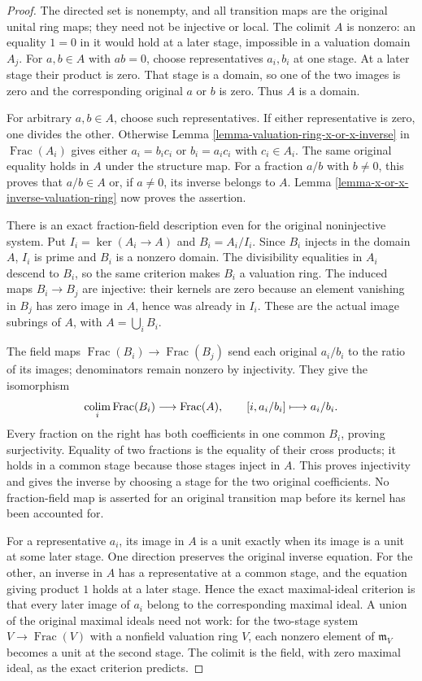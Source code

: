 \begin{proof}
The directed set is nonempty,
and all transition maps are
the original unital ring maps;
they need not be injective
or local. The colimit $A$
is nonzero: an equality
$1=0$ in it would hold
at a later stage, impossible
in a valuation domain $A_j$.
For $a,b\in A$ with $ab=0$,
choose representatives $a_i,b_i$
at one stage. At a later
stage their product is zero.
That stage is a domain,
so one of the two images
is zero and the corresponding
original $a$ or $b$ is zero.
Thus $A$ is a domain.

For arbitrary $a,b\in A$,
choose such representatives.
If either representative is
zero, one divides the other.
Otherwise Lemma
\ref{lemma-valuation-ring-x-or-x-inverse}
in $\operatorname{Frac}(A_i)$
gives either $a_i=b_i c_i$
or $b_i=a_i c_i$ with
$c_i\in A_i$. The same
original equality holds in
$A$ under the structure map.
For a fraction $a/b$ with
$b\neq0$, this proves that
$a/b\in A$ or, if $a\neq0$,
its inverse belongs to $A$.
Lemma
\ref{lemma-x-or-x-inverse-valuation-ring}
now proves the assertion.

There is an exact fraction-field
description even for the original
noninjective system. Put
$I_i=\ker(A_i\to A)$ and
$B_i=A_i/I_i$. Since $B_i$
injects in the domain $A$,
$I_i$ is prime and $B_i$
is a nonzero domain. The
divisibility equalities in
$A_i$ descend to $B_i$,
so the same criterion makes
$B_i$ a valuation ring.
The induced maps $B_i\to B_j$
are injective: their kernels
are zero because an element
vanishing in $B_j$ has zero
image in $A$, hence was
already in $I_i$.
These are the actual image
subrings of $A$, with
$A=\bigcup_i B_i$.

The field maps
$\operatorname{Frac}(B_i)\to\operatorname{Frac}(B_j)$
send each original $a_i/b_i$
to the ratio of its images;
denominators remain nonzero
by injectivity. They give
the isomorphism
$$
\mathop{\rm colim}_i\operatorname{Frac}(B_i)
\longrightarrow\operatorname{Frac}(A),
\qquad[i,a_i/b_i]\longmapsto a_i/b_i.
$$
Every fraction on the right
has both coefficients in
one common $B_i$, proving
surjectivity. Equality of two
fractions is the equality
of their cross products;
it holds in a common stage
because those stages inject
in $A$. This proves injectivity
and gives the inverse by
choosing a stage for the
two original coefficients.
No fraction-field map is
asserted for an original
transition map before its
kernel has been accounted for.

For a representative $a_i$,
its image in $A$ is a unit
exactly when its image is
a unit at some later stage.
One direction preserves the
original inverse equation.
For the other, an inverse
in $A$ has a representative
at a common stage, and
the equation giving product
$1$ holds at a later stage.
Hence the exact maximal-ideal
criterion is that every
later image of $a_i$ belong
to the corresponding maximal
ideal. A union of the
original maximal ideals need
not work: for the two-stage
system $V\to\operatorname{Frac}(V)$
with a nonfield valuation
ring $V$, each nonzero
element of $\mathfrak m_V$
becomes a unit at the
second stage. The colimit
is the field, with zero
maximal ideal, as the exact
criterion predicts.
\end{proof}

